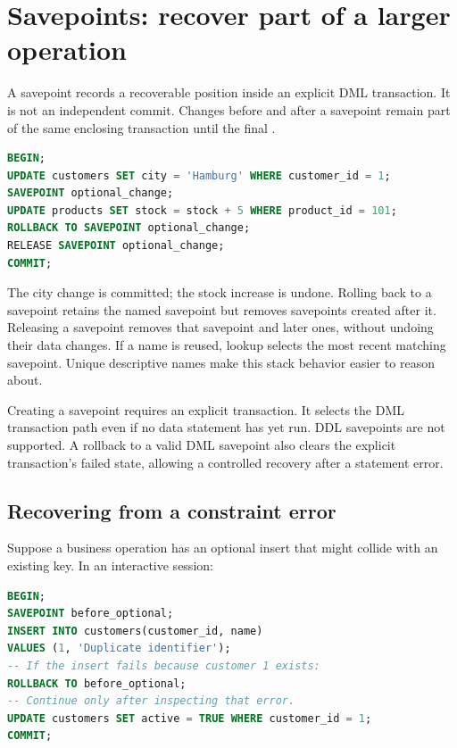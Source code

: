 \section{Savepoints: recover part of a larger operation}

A savepoint records a recoverable position inside an explicit DML
transaction. It is not an independent commit. Changes before and after a
savepoint remain part of the same enclosing transaction until the final
.

\begin{lstlisting}[language=SQL]
BEGIN;
UPDATE customers SET city = 'Hamburg' WHERE customer_id = 1;
SAVEPOINT optional_change;
UPDATE products SET stock = stock + 5 WHERE product_id = 101;
ROLLBACK TO SAVEPOINT optional_change;
RELEASE SAVEPOINT optional_change;
COMMIT;
\end{lstlisting}

The city change is committed; the stock increase is undone. Rolling back to
a savepoint retains the named savepoint but removes savepoints created after
it. Releasing a savepoint removes that savepoint and later ones, without
undoing their data changes. If a name is reused, lookup selects the most
recent matching savepoint. Unique descriptive names make this stack behavior
easier to reason about.

Creating a savepoint requires an explicit transaction. It selects the DML
transaction path even if no data statement has yet run. DDL savepoints are
not supported. A rollback to a valid DML savepoint also clears the explicit
transaction's failed state, allowing a controlled recovery after a statement
error.

\subsection{Recovering from a constraint error}

Suppose a business operation has an optional insert that might collide with
an existing key. In an interactive session:

\begin{lstlisting}[language=SQL]
BEGIN;
SAVEPOINT before_optional;
INSERT INTO customers(customer_id, name)
VALUES (1, 'Duplicate identifier');
-- If the insert fails because customer 1 exists:
ROLLBACK TO before_optional;
-- Continue only after inspecting that error.
UPDATE customers SET active = TRUE WHERE customer_id = 1;
COMMIT;
\end{lstlisting}

